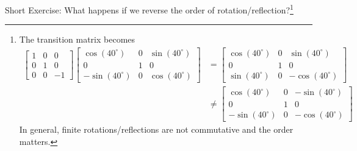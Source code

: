 Short Exercise: What happens if we reverse the order of rotation/reflection?\footnote{The transition matrix becomes
\begin{align*}
\begin{bmatrix}
1 & 0 & 0 \\
0 & 1 & 0 \\
0 & 0 & -1
\end{bmatrix}
\begin{bmatrix}
\cos(40^\circ) & 0 & \sin(40^\circ) \\
0 & 1 & 0 \\
-\sin(40^\circ) & 0 & \cos(40^\circ)
\end{bmatrix}
&=
\begin{bmatrix}
\cos(40^\circ) & 0 & \sin(40^\circ) \\
0 & 1 & 0 \\
\sin(40^\circ) & 0 & -\cos(40^\circ)
\end{bmatrix} \\
&\neq 
\begin{bmatrix}
\cos(40^\circ) & 0 & -\sin(40^\circ) \\
0 & 1 & 0 \\
-\sin(40^\circ) & 0 & -\cos(40^\circ)
\end{bmatrix}
\end{align*}
In general, finite rotations/reflections are not commutative and the order matters.
}

